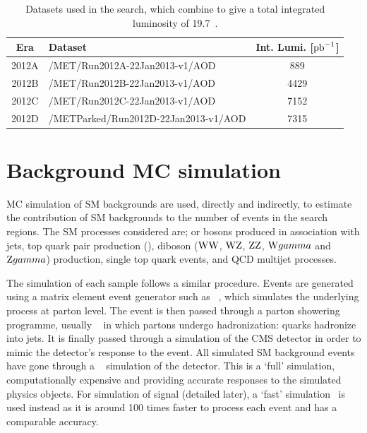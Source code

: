 \begin{table} %
    \begin{center}
    \caption{Datasets used in the search, which combine to give a total integrated luminosity of 19.7~\fbinv.}
     \begin{tabular}{clc}\hline
Era    &       Dataset  &  Int. Lumi. [$\mathrm{pb}^{-1}$]\\ \hline
2012A & /MET/Run2012A-22Jan2013-v1/AOD & 889 \\
2012B & /MET/Run2012B-22Jan2013-v1/AOD & 4429 \\
2012C & /MET/Run2012C-22Jan2013-v1/AOD & 7152 \\
2012D & /METParked/Run2012D-22Jan2013-v1/AOD & 7315 \\ \hline
                \end{tabular}
                    \label{tab:dataSets}
\end{center}
\end{table}




%
\section{Background MC simulation} 
\label{sec:GEN}
\ac{MC} simulation of \ac{SM} backgrounds are used, directly and indirectly, to estimate the contribution of \ac{SM} backgrounds to the number of events in the search regions. 
The \ac{SM} processes considered are;  \W or \Z bosons produced in association with jets, top quark pair production (\ttbar), diboson ($\mathrm{W}\mathrm{W}{}$, $\mathrm{W}\mathrm{Z}{}$, $\mathrm{Z}\mathrm{Z}{}$, $\mathrm{W}gamma{}$ and $\mathrm{Z}gamma${}) production, single top quark events, and QCD multijet processes.

The simulation of each sample follows a similar procedure.
Events are generated using a matrix element event generator such as \MADGRAPH{}~\cite{madgraph,madgraph2}, which simulates the underlying process at parton level. 
The event is then passed through a parton showering programme, usually \PYTHIA{}~\cite{pythia,pythia8,pythia-z2} in which partons undergo hadronization: quarks hadronize into jets.
It is finally passed through a simulation of the CMS detector in order to mimic the detector's response to the event.
All simulated \ac{SM} background events have gone through a \GEANTfour~\cite{Geant4-1,Geant4-2} simulation of the detector. 
This is a `full' simulation, computationally expensive and providing accurate responses to the simulated physics objects.  
For simulation of signal (detailed later), a `fast' simulation~\cite{FASTSIM} is used instead as it is around 100 times faster to process each event and has a comparable accuracy.

